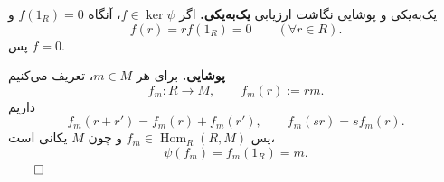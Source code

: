 \begin{frame}[t]{یک‌به‌یکی و پوشایی نگاشت ارزیابی}
    \label{lec07:evaluation-bijectivity}
    \textbf{یک‌به‌یکی.} اگر \(f\in\ker\psi\)، آنگاه \(f(1_R)=0\) و
    \[
        f(r)=rf(1_R)=0\qquad(\forall r\in R).
    \]
    پس \(f=0\).
    \medskip

    \textbf{پوشایی.} برای هر \(m\in M\)، تعریف می‌کنیم
    \[
        f_m:R\longrightarrow M,\qquad f_m(r):=rm.
    \]
    داریم
    \[
        f_m(r+r')=f_m(r)+f_m(r'),\qquad f_m(sr)=s f_m(r).
    \]
    پس \(f_m\in\operatorname{Hom}_R(R,M)\) و چون \(M\) یکانی است،
    \[
        \psi(f_m)=f_m(1_R)=m.
    \]
    \hfill\(\qed\)
\end{frame}


